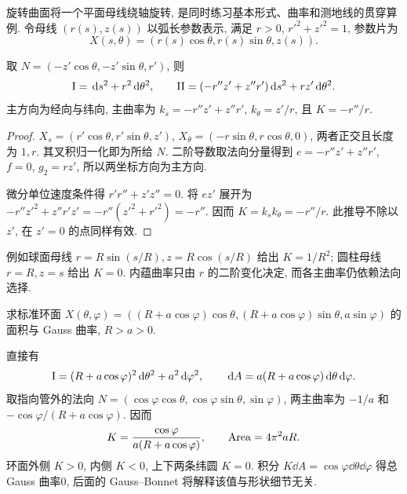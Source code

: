 旋转曲面将一个平面母线绕轴旋转, 是同时练习基本形式、曲率和测地线的贯穿算例. 令母线 $(r(s),z(s))$ 以弧长参数表示, 满足 $r>0$, $r'^2+z'^2=1$, 参数片为
\[
 X(s,\theta)=(r(s)\cos\theta,r(s)\sin\theta,z(s)).
\]
\begin{proposition}\label{prop:rotation}
取 $N=(-z'\cos\theta,-z'\sin\theta,r')$, 则
\[
 \mathrm{I}=\,\mathrm d s^2+r^2\,\mathrm d\theta^2,\qquad
 \mathrm{II}=(-r''z'+z''r')\,\mathrm d s^2+rz'\,\mathrm d\theta^2.
\]
主方向为经向与纬向, 主曲率为 $k_s=-r''z'+z''r'$, $k_\theta=z'/r$, 且 $K=-r''/r$.
\end{proposition}
\begin{proof}
$X_s=(r'\cos\theta,r'\sin\theta,z')$, $X_\theta=(-r\sin\theta,r\cos\theta,0)$, 两者正交且长度为 $1,r$. 其叉积归一化即为所给 $N$. 二阶导数取法向分量得到 $e=-r''z'+z''r'$, $f=0$, $g_2=rz'$, 所以两坐标方向为主方向.

微分单位速度条件得 $r'r''+z'z''=0$. 将 $e z'$ 展开为 $-r''z'^2+z''r'z'=-r''(z'^2+r'^2)=-r''$. 因而 $K=k_sk_\theta=-r''/r$. 此推导不除以 $z'$, 在 $z'=0$ 的点同样有效.
\end{proof}
例如球面母线 $r=R\sin(s/R),z=R\cos(s/R)$ 给出 $K=1/R^2$; 圆柱母线 $r=R,z=s$ 给出 $K=0$. 内蕴曲率只由 $r$ 的二阶变化决定, 而各主曲率仍依赖法向选择.
\begin{example}
求标准环面 $X(\theta,\varphi)=((R+a\cos\varphi)\cos\theta,(R+a\cos\varphi)\sin\theta,a\sin\varphi)$ 的面积与 Gauss 曲率, $R>a>0$.
\end{example}
\begin{solution}
直接有
\[
 \mathrm{I}=(R+a\cos\varphi)^2\,\mathrm d\theta^2+a^2\,\mathrm d\varphi^2,\qquad
 \,\mathrm d A=a(R+a\cos\varphi)\,\mathrm d\theta\,\mathrm d\varphi.
\]
取指向管外的法向 $N=(\cos\varphi\cos\theta,\cos\varphi\sin\theta,\sin\varphi)$, 两主曲率为 $-1/a$ 和 $-\cos\varphi/(R+a\cos\varphi)$. 因而
\[
 K=\frac{\cos\varphi}{a(R+a\cos\varphi)},\qquad \operatorname{Area}=4\pi^2aR.
\]
环面外侧 $K>0$, 内侧 $K<0$, 上下两条纬圆 $K=0$. 积分 $K\dd A=\cos\varphi\dd\theta\dd\varphi$ 得总 Gauss 曲率0, 后面的 Gauss--Bonnet 将解释该值与形状细节无关.
\end{solution}
\begin{center}
\end{center}

